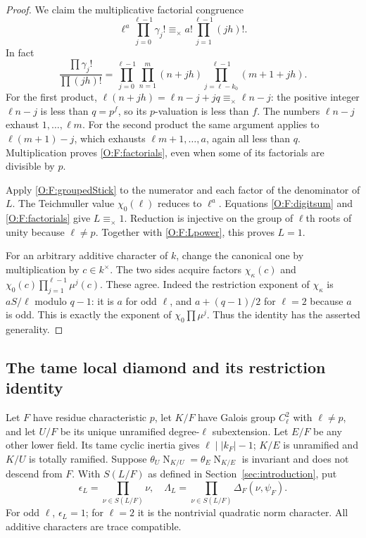 \documentclass[11pt]{amsart}
\theoremstyle{definition}
\theoremstyle{remark}
\newcommand{\Nm}{\operatorname{N}}
\begin{document}
\begin{proof}
We claim the multiplicative factorial congruence
\begin{equation}\label{O:F:factorials}
 \ell^a\prod_{j=0}^{\ell-1}\gamma_j!
 \equiv_\times a!\prod_{j=1}^{\ell-1}(jh)!.
\end{equation}
In fact
\[
 \frac{\prod\gamma_j!}{\prod(jh)!}
 =\prod_{j=0}^{\ell-1}\prod_{n=1}^{m}(n+jh)
      \prod_{j=\ell-k_0}^{\ell-1}(m+1+jh).
\]
For the first product,
$\ell(n+jh)=\ell n-j+jq\equiv_\times\ell n-j$:
the positive integer $\ell n-j$ is less than $q=p^f$, so its
$p$-valuation is less than $f$. The numbers $\ell n-j$ exhaust
$1,\ldots,\ell m$. For the second product the same argument applies
to $\ell(m+1)-j$, which exhausts $\ell m+1,\ldots,a$, again all
less than $q$. Multiplication proves \eqref{O:F:factorials}, even when
some of its factorials are divisible by $p$.

Apply \eqref{O:F:groupedStick} to the numerator and each factor of the
denominator of $L$. The Teichmuller value $\chi_0(\ell)$ reduces to
$\ell^a$. Equations \eqref{O:F:digitsum} and \eqref{O:F:factorials} give
$L\equiv_\times1$. Reduction is injective on the group of
$\ell$th roots of unity because $\ell\ne p$.
Together with \eqref{O:F:Lpower}, this proves $L=1$.

For an arbitrary additive character of $k$, change the canonical one
by multiplication by $c\in k^\times$. The two sides acquire factors
$\chi_\kappa(c)$ and $\chi_0(c)\prod_{j=1}^{\ell-1}\mu^j(c)$.
These agree. Indeed the restriction exponent of $\chi_\kappa$ is
$aS/\ell$ modulo $q-1$: it is $a$ for odd $\ell$, and $a+(q-1)/2$
for $\ell=2$ because $a$ is odd. This is exactly the exponent of
$\chi_0\prod\mu^j$. Thus the identity has the asserted generality.
\end{proof}

\subsection{The tame local diamond and its restriction identity}
Let $F$ have residue characteristic $p$, let $K/F$ have Galois
group $C_\ell^2$ with $\ell\ne p$, and let $U/F$ be its unique
unramified degree-$\ell$ subextension. Let $E/F$ be any other
lower field. Its tame cyclic inertia gives $\ell\mid |k_F|-1$;
$K/E$ is unramified and $K/U$ is totally ramified.
Suppose $\theta_U\Nm_{K/U}=\theta_E\Nm_{K/E}$ is invariant and
does not descend from $F$. With $S(L/F)$ as defined in
Section~\ref{sec:introduction}, put
\[
 \epsilon_L=\prod_{\nu\in S(L/F)}\nu,\quad
 \Lambda_L=\prod_{\nu\in S(L/F)}\Delta_F(\nu,\psi_F).
\]
For odd $\ell$, $\epsilon_L=1$; for $\ell=2$ it is the nontrivial
quadratic norm character. All additive characters are trace compatible.
\end{document}
